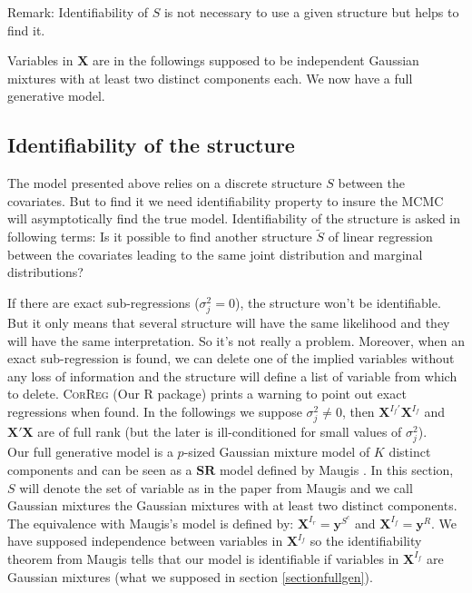 \documentclass[12pt,a4paper]{report}
\begin{document}
		Remark:  Identifiability of $S$ is not necessary to use a given structure but helps to find it.

		Variables in $\boldsymbol{X}$ are in the followings supposed to be independent Gaussian mixtures with at least two distinct components each. 
	We now have a full generative model.
	
\subsection{Identifiability of the structure} \label{preuveident}
	The model presented above relies on a discrete structure $S$ between the covariates. But to find it we need identifiability property to insure the MCMC will asymptotically find the true model. Identifiability of the structure is asked in following terms: Is it possible to find another structure $\tilde{S}$ of linear regression between the covariates leading to the same joint distribution and marginal distributions? 
	
		If there are exact sub-regressions ($\sigma^2_j=0$), the structure won't be identifiable. But it only means that several structure will have the same likelihood and they will have the same interpretation. So it's not really a problem. Moreover, when an exact sub-regression is found, we can delete one of the implied variables without any loss of information and the structure will define a list of variable from which to delete. \textsc{CorReg} (Our R package) prints a warning to point out exact regressions when found.
	In the followings we suppose $\sigma^2_j\neq 0$, then $\boldsymbol{X}^{I_f'}\boldsymbol{X}^{I_f}$ and $\boldsymbol{X}'\boldsymbol{X}$ are of full rank (but the later is ill-conditioned for small values of $\sigma^2_j$).
	\\
	
Our full generative model is a $p$-sized Gaussian mixture model of $K$ distinct components and 
%	
	can be seen as a $\mathbf{SR}$ model defined by Maugis \cite{maugis2009variable}. In this section, $S$ will denote the set of variable as in the paper from Maugis and we call Gaussian mixtures the Gaussian mixtures with at least two distinct components. The equivalence with Maugis's model is defined by:
	$\boldsymbol{X}^{I_r}=\boldsymbol{y}^{S^c}$ and $\boldsymbol{X}^{I_f}=\boldsymbol{y}^R$. We have supposed independence between variables in $\boldsymbol{X}^{I_f}$ so the identifiability theorem from Maugis tells that our model is identifiable if variables in $\boldsymbol{X}^{I_f}$ are Gaussian mixtures (what we supposed in section \ref{sectionfullgen}).
	\\
	
\end{document}
